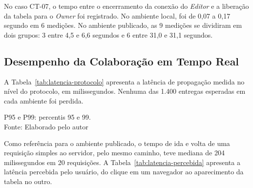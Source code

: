No caso CT-07, o tempo entre o encerramento da conexão do \textit{Editor} e a liberação da tabela para o \textit{Owner} foi registrado. No ambiente local, foi de 0,07 a 0,17 segundo em 6 medições. No ambiente publicado, as 9 medições se dividiram em dois grupos: 3 entre 4,5 e 6,6 segundos e 6 entre 31,0 e 31,1 segundos.

\subsection{Desempenho da Colaboração em Tempo Real}

A Tabela~\ref{tab:latencia-protocolo} apresenta a latência de propagação medida no nível do protocolo, em milissegundos. Nenhuma das 1.400 entregas esperadas em cada ambiente foi perdida.

\begin{table}[H]
\centering
\renewcommand{\arraystretch}{1.4}
\caption{Latência de propagação no nível do protocolo (ms)}
\label{tab:latencia-protocolo}
\begin{center}
    {\small P95 e P99: percentis 95 e 99.}\\
    {\small Fonte: Elaborado pelo autor}
\end{center}
\end{table}

Como referência para o ambiente publicado, o tempo de ida e volta de uma requisição simples ao servidor, pelo mesmo caminho, teve mediana de 204 milissegundos em 20 requisições. A Tabela~\ref{tab:latencia-percebida} apresenta a latência percebida pelo usuário, do clique em um navegador ao aparecimento da tabela no outro.

